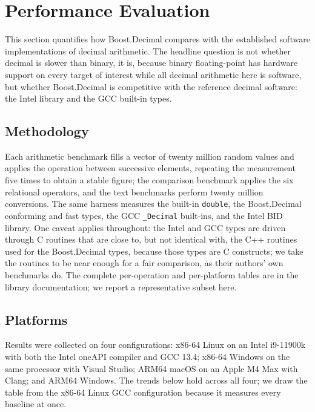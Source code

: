 \documentclass[acmsmall]{acmart}
\begin{document}
\section{Performance Evaluation}
\label{sec:performance}

This section quantifies how Boost.Decimal compares with the established software
implementations of decimal arithmetic. The headline question is not whether decimal is
slower than binary, it is, because binary floating-point has hardware support on every
target of interest while all decimal arithmetic here is software, but whether
Boost.Decimal is competitive with the reference decimal software: the Intel library and
the GCC built-in types.

\subsection{Methodology}
Each arithmetic benchmark fills a vector of twenty million random values and applies the
operation between successive elements, repeating the measurement five times to obtain a
stable figure; the comparison benchmark applies the six relational operators, and the
text benchmarks perform twenty million conversions. The same harness measures the
built-in \texttt{double}, the Boost.Decimal conforming and fast types, the GCC
\texttt{\_Decimal} built-ins, and the Intel BID library. One caveat applies throughout:
the Intel and GCC types are driven through C routines that are close to, but not identical
with, the C++ routines used for the Boost.Decimal types, because those types are C
constructs; we take the routines to be near enough for a fair comparison, as their
authors' own benchmarks do. The complete per-operation and per-platform tables are in the
library documentation; we report a representative subset here.

\subsection{Platforms}
Results were collected on four configurations: x86-64 Linux on an Intel i9-11900k with
both the Intel oneAPI compiler and GCC 13.4; x86-64 Windows on the same processor with
Visual Studio; ARM64 macOS on an Apple M4 Max with Clang; and ARM64 Windows. The trends
below hold across all four; we draw the table from the x86-64 Linux GCC configuration
because it measures every baseline at once.
\end{document}
